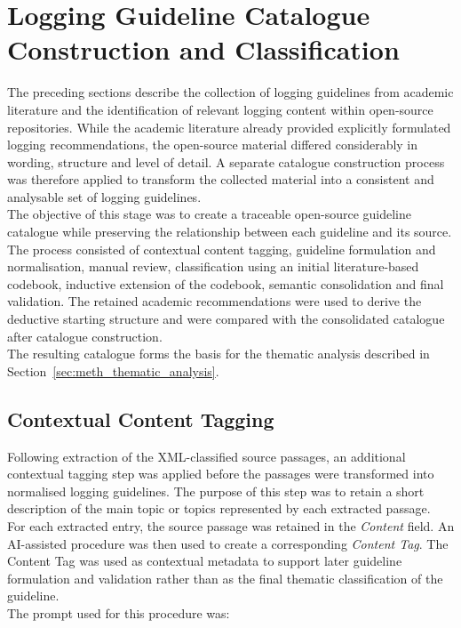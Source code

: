 \section{Logging Guideline Catalogue Construction and Classification}
\label{sec:meth_classification}

The preceding sections describe the collection of logging guidelines from academic
literature and the identification of relevant logging content within open-source
repositories. While the academic literature already provided explicitly formulated
logging recommendations, the open-source material differed considerably in wording,
structure and level of detail. A separate catalogue construction process was therefore
applied to transform the collected material into a consistent and analysable set of
logging guidelines.
\\
The objective of this stage was to create a traceable open-source guideline catalogue while
preserving the relationship between each guideline and its source. The
process consisted of contextual content tagging, guideline formulation and normalisation,
manual review, classification using an initial literature-based codebook, inductive
extension of the codebook, semantic consolidation and final validation. The retained
academic recommendations were used to derive the deductive starting structure and were
compared with the consolidated catalogue after catalogue construction.
\\
The resulting catalogue forms the basis for the thematic analysis described in
Section~\ref{sec:meth_thematic_analysis}.

\subsection{Contextual Content Tagging}

Following extraction of the XML-classified source passages, an additional contextual
tagging step was applied before the passages were transformed into normalised logging
guidelines. The purpose of this step was to retain a short description of the main
topic or topics represented by each extracted passage.
\\
For each extracted entry, the source passage was retained in the
\textit{Content} field. An AI-assisted procedure was then used to create a corresponding
\textit{Content Tag}. The Content Tag was used as contextual metadata to support later
guideline formulation and validation rather than as the final thematic classification
of the guideline.
\\
The prompt used for this procedure was:

